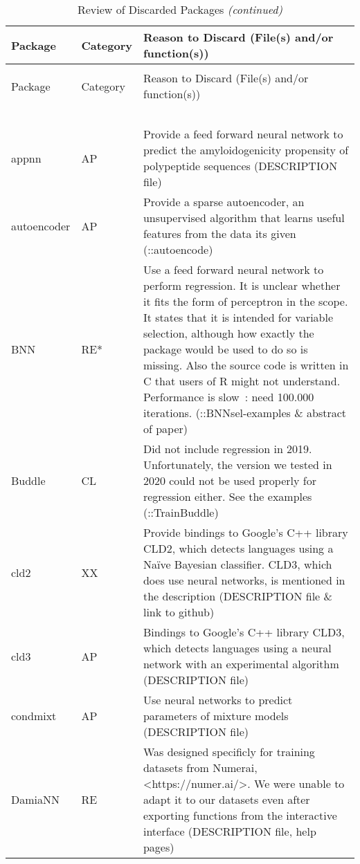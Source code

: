 \begin{Schunk}
\begingroup\fontsize{7}{9}\selectfont

\begin{longtable}[t]{ll>{\raggedright\arraybackslash}p{10cm}}
\caption{\label{tab:unnamed-chunk-4}Review of Discarded Packages}\\
\toprule
Package & Category & Reason to Discard (File(s) and/or function(s))\\
\midrule
\endfirsthead
\caption[]{Review of Discarded Packages \textit{(continued)}}\\
\toprule
Package & Category & Reason to Discard (File(s) and/or function(s))\\
\midrule
\endhead
\
\endfoot
\bottomrule
\multicolumn{3}{l}{\textit{Note: } AP=Application, CL=Classification, RE=Regression, RE*=?, TS=Time serie, UT=Utility, XX=Other.}\\
\endlastfoot
appnn & AP & Provide a feed forward neural network to predict the amyloidogenicity propensity of polypeptide sequences (DESCRIPTION file)\\
autoencoder & AP & Provide a sparse autoencoder, an unsupervised algorithm that learns useful features from the data its given (::autoencode)\\
BNN & RE* & Use a feed forward neural network to perform regression. It is unclear whether it fits the form of perceptron in the scope. It states that it is intended for variable selection, although how exactly the package would be used to do so is missing. Also the source code is written in C that users of R might not understand. Performance is slow : need 100.000 iterations. (::BNNsel-examples \& abstract of paper)\\
Buddle & CL & Did not include regression in 2019. Unfortunately, the version we tested in 2020 could not be used properly for regression either. See the examples (::TrainBuddle)\\
cld2 & XX & Provide bindings to Google's C++ library CLD2, which detects languages using a Naïve Bayesian classifier. CLD3, which does use neural networks, is mentioned in the description (DESCRIPTION file \& link to github)\\
\addlinespace
cld3 & AP & Bindings to Google's C++ library CLD3, which detects languages using a neural network with an experimental algorithm (DESCRIPTION file)\\
condmixt & AP & Use neural networks to predict parameters of mixture models (DESCRIPTION file)\\
DamiaNN & RE & Was designed specificly for training datasets from Numerai, <https://numer.ai/>. We were unable to adapt it to our datasets even after exporting functions from the interactive interface (DESCRIPTION file, help pages)\\

\end{longtable}
\end{Schunk}
